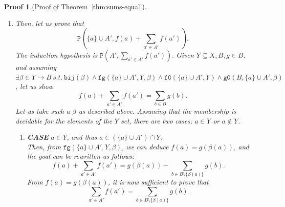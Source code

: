 \documentclass[pdflatex,sn-mathphys]{sn-jnl}%
\theoremstyle{thmstyleone}%
\theoremstyle{thmstyletwo}%
\newtheorem*{pf}{Proof}%
\theoremstyle{thmstylethree}%
\begin{document}
\begin{appendices}
\begin{pf}[Proof of Theorem~\ref{thm:sums-equal}]
\begin{enumerate}
         Given a $Y\subseteq{}X,B,g\in{}B$, and assuming
         $\exists{}\beta\in{}Y\rightarrow{}B~s.t.~\mathtt{bij}(\beta)\land\mathtt{fg}(\emptyset,Y,\beta)\land\mathtt{f0}(\emptyset,Y)\land\mathtt{g0}(B,\emptyset,\beta)$,
         let us show
         \begin{equation*}
           \boxed{0=\sum\limits_{b\in{}B}g(b).}
         \end{equation*}
         Let us take such a $\beta$. From $\mathtt{g0}(B,\emptyset,\beta)$,
         we can deduce that $\forall{}b\in{}B,g(b)=0$, and thus that
         $\sum\limits_{b\in{}B}g(b)=0$.
       \item Then, let us prove that
         \begin{equation*}
           \boxed{\mathtt{P}(\{a\}\cup{}A',f(a)+\sum_{a'\in{}A'}f(a')).}
         \end{equation*}
         The induction hypothesis is
         $\mathtt{P}(A',\sum\limits_{a'\in{}A'}f(a'))$. Given
         $Y\subseteq{}X,B,g\in{}B$, and assuming
         $\exists{}\beta\in{}Y\rightarrow{}B~s.t.~\mathtt{bij}(\beta)\land\mathtt{fg}(\{a\}\cup{}A',Y,\beta)\land\mathtt{f0}(\{a\}\cup{}A',Y)\land\mathtt{g0}(B,\{a\}\cup{}A',\beta)$,
         let us show
         \begin{equation*}
           \boxed{f(a)+\sum_{a'\in{}A'}f(a')=\sum\limits_{b\in{}B}g(b).}
         \end{equation*}
         Let us take such a $\beta$ as described above. Assuming that
         the membership is decidable for the elements of the $Y$ set,
         there are two cases: $a\in{}Y$ or $a\notin{}Y$.

         \begin{enumerate}
         \item \textbf{CASE} $a\in{}Y$, and thus
           $a\in(\{a\}\cup{}A')\cap{}Y$:\\

           Then, from $\mathtt{fg}(\{a\}\cup{}A',Y,\beta)$, we can deduce
           $f(a)=g(\beta(a))$, and the goal can be rewritten as follows:
           \begin{equation*}
             \boxed{f(a)+\sum_{a'\in{}A'}f(a')=g(\beta(a))+\sum\limits_{b\in{}B\setminus\{\beta(a)\}}g(b).}
           \end{equation*}
           From $f(a)=g(\beta(a))$, it is now sufficient to prove that
           \begin{equation*}
             \boxed{\sum_{a'\in{}A'}f(a')=\sum\limits_{b\in{}B\setminus\{\beta(a)\}}g(b).}
           \end{equation*}


\end{enumerate}
\end{enumerate}
\end{pf}
\end{appendices}
\end{document}
